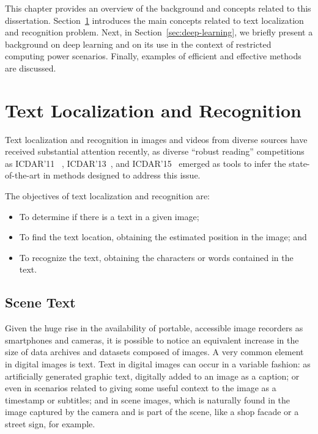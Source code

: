 This chapter provides an overview of the background and concepts related to this dissertation. Section~\ref{sec:text-localization-recognition}
introduces the main concepts related to text localization and recognition problem. Next, in Section~\ref{sec:deep-learning},  we briefly present a background on deep learning and on its use in the context of restricted computing power scenarios. Finally, examples of efficient and effective methods are discussed.

\section{Text Localization and Recognition}
\label{sec:text-localization-recognition}

Text localization and recognition in images and videos from diverse sources have received substantial attention recently, as diverse ``robust reading'' competitions as ICDAR'11 ~\cite{Karatzas2011ICDAR}, ICDAR'13~\cite{Karatzas2013ICDAR}, and ICDAR'15~\cite{icdar15} emerged as tools to infer the state-of-the-art in methods designed to address this issue.%


The objectives of text localization and recognition are:
\begin{itemize}
    \item To determine if there is a text in a given image;
    \item To find the text location, obtaining the estimated position in the image; and %
    \item To recognize the text, obtaining the characters or words contained in the text.%
\end{itemize}

\subsection{Scene Text}
    Given the huge rise in the availability of portable, accessible image recorders as smartphones and cameras, it is possible to notice an equivalent increase in the size of data archives and datasets composed of images. A very common element in digital images is text. Text in digital images can occur in a variable fashion: as artificially generated graphic text, digitally added to an image as a caption; or even in scenarios related to giving some useful context to the image as a timestamp or subtitles; and in scene images, which is naturally found in the image captured by the camera and is part of the scene, like a shop facade or a street sign, for example. 
    
